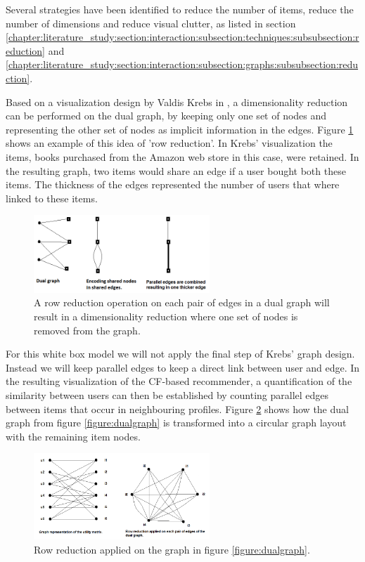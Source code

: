 Several strategies have been identified to reduce the number of items, reduce the number of dimensions and reduce visual clutter, as listed in section \ref{chapter:literature_study:section:interaction:subsection:techniques:subsubsection:reduction} and \ref{chapter:literature_study:section:interaction:subsection:graphs:subsubsection:reduction}.

Based on a visualization design by Valdis Krebs in \cite{steele:2010}, a dimensionality reduction can be performed on the dual graph, by keeping only one set of nodes and representing the other set of nodes as implicit information in the edges. Figure \ref{figure:rowreduction} shows an example of this idea of 'row reduction'. In Krebs' visualization the items, books purchased from the Amazon web store in this case, were retained. In the resulting graph, two items would share an edge if a user bought both these items. The thickness of the edges represented the number of users that where linked to these items\cite{krebs:2012:networkthinkers, steele:2010}.

\begin{figure}%
	\begin{center}
		\includegraphics[width=250px]{img/row_reduction}%
	\end{center}
	\caption{A row reduction operation on each pair of edges in a dual graph will result in a dimensionality reduction where one set of nodes is removed from the graph.}%
	\label{figure:rowreduction}%
\end{figure}

For this white box model we will not apply the final step of Krebs' graph design. Instead we will keep parallel edges to keep a direct link between user and edge. In the resulting visualization of the CF-based recommender, a quantification of the similarity between users can then be established by counting parallel edges between items that occur in neighbouring profiles. Figure \ref{figure:rowreduction_dualgraph} shows how the dual graph from figure \ref{figure:dualgraph} is transformed into a circular graph layout with the remaining item nodes.

\begin{figure}%
	\begin{center}
		\includegraphics[width=250px]{img/dualgraph_rowreduction}%
	\end{center}
	\caption{Row reduction applied on the graph in figure \ref{figure:dualgraph}.}%
	\label{figure:rowreduction_dualgraph}%
\end{figure}

